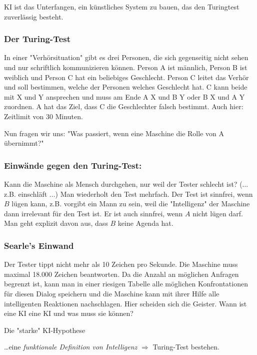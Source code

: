\documentclass[runningheads,deutsch]{llncs}
\begin{document}
KI ist das Unterfangen, ein künstliches System zu bauen, das den Turingtest zuverlässig besteht.

\subsubsection{Der Turing-Test}
In einer "Verhörsituation" gibt es drei Personen, die sich gegenseitig nicht sehen und nur schriftlich kommunizieren können. Person A ist männlich, Person B ist weiblich und Person C hat ein beliebiges Geschlecht. Person C leitet das Verhör und soll bestimmen, welche der Personen welches Geschlecht hat. C kann beide mit X und Y ansprechen und muss am Ende A X und B Y oder B X und A Y zuordnen. A hat das Ziel, dass C die Geschlechter falsch bestimmt. Auch hier: Zeitlimit von 30 Minuten.

Nun fragen wir uns: "Was passiert, wenn eine Maschine die Rolle von A übernimmt?" 

\subsubsection{Einwände gegen den Turing-Test:}

Kann die Maschine als Mensch durchgehen, nur weil der Tester schlecht ist? (... z.B. einschläft ...) Man wiederholt den Test mehrfach. Der Test ist sinnfrei, wenn $B$ lügen kann, z.B. vorgibt ein Mann zu sein, weil die "Intelligenz" der Maschine dann irrelevant für den Test ist. Er ist auch sinnfrei, wenn $A$ nicht lügen darf. Man geht explizit davon aus, dass $B$ keine Agenda hat.

\subsubsection{Searle's Einwand}

Der Tester tippt nicht mehr als 10 Zeichen pro Sekunde. Die Maschine muss maximal 18.000 Zeichen beantworten. Da die Anzahl an möglichen Anfragen begrenzt ist, kann man in einer riesigen Tabelle alle möglichen Konfrontationen für diesen Dialog speichern und die Maschine kann mit ihrer Hilfe alle intelligenten Reaktionen nachschlagen. Hier scheiden sich die Geister. Wann ist eine KI eine KI und was muss sie können?


\begin{definition}{Die "starke" KI-Hypothese}

\dots eine \textit{funktionale Definition von Intelligenz} $\Rightarrow$ Turing-Test bestehen.

\end{definition}
\end{document}
